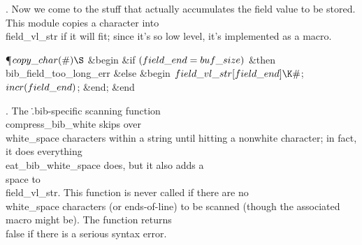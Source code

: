 .
Now we come to the stuff that actually accumulates the field value to
be stored.  This module copies a character into \\{field\_vl\_str} if it
will fit; since it's so low level, it's implemented as a macro.

\Y\P\D {}$\\{copy\_char}(\#)\S$\1\6
\&{begin} \&{if} $(\\{field\_end}=\\{buf\_size})$ \1\&{then}\5
\\{bib\_field\_too\_long\_err}\6
\4\&{else} \&{begin} $\\{field\_vl\_str}[\\{field\_end}]\K\#$;\5
$\\{incr}(\\{field\_end})$;\6
\&{end};\2\6
\&{end}\2\par
\fi

.
The \.{.bib}-specific scanning function \\{compress\_bib\_white} skips
over \\{white\_space} characters within a string until hitting a nonwhite
character; in fact, it does everything \\{eat\_bib\_white\_space} does, but
it also adds a \\{space} to \\{field\_vl\_str}.  This function is never
called if there are no \\{white\_space} characters (or ends-of-line) to
be scanned (though the associated macro might be).  The function
returns \\{false} if there is a serious syntax error.

